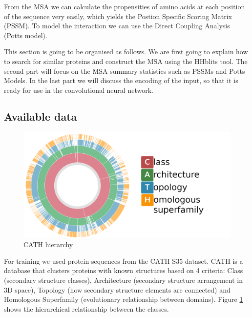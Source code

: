 From the MSA we can calculate the propensities of amino acids at each position of the sequence very easily, which yields the Postion Specific Scoring Matrix (PSSM). 
To model the interaction we can use the Direct Coupling Analysis (Potts model).
    
This section is going to be organised as follows. 
We are first going to explain how to search for similar proteins and construct the MSA using the HHblits tool. 
The second part will focus on the MSA summary statistics such as PSSMs and Potts Models. 
In the last part we will discuss the encoding of the input, so that it is ready for use in the convolutional neural network.
    
\subsection{Available data}
    
\begin{figure}[b!]
    \centering
    \includegraphics[width=\linewidth]{imgs_tomas/cath.png}
    \caption{CATH hierarchy \cite{cath}}
    \label{fig:cath}
\end{figure}
    
For training we used protein sequences from the CATH S35 dataset. 
CATH is a database that clusters proteins with known structures based on 4 criteria: Class (secondary structure classes), Architecture (secondary structure arrangement in 3D space), Topology (how secondary structure elements are connected) and Homologous Superfamily (evolutionary relationship between domains). 
Figure \ref{fig:cath} shows the hierarchical relationship between the classes.
    

